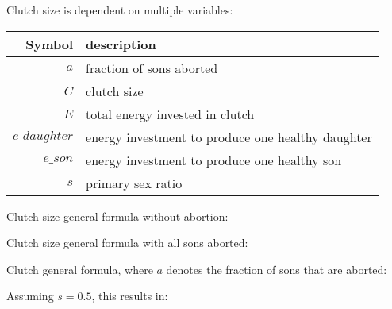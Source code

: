 \documentclass[11]{article}
\begin{document}
Clutch size is dependent on multiple variables:

\bigskip

\begin{tabular}{ | r | l | }
  \hline
  Symbol & description \\ 
  \hline
  $a$ & fraction of sons aborted \\
  $C$ & clutch size \\
  $E$ & total energy invested in clutch \\
  $e\_daughter$ & energy investment to produce one healthy daughter \\
  $e\_son$ & energy investment to produce one healthy son \\
  $s$ & primary sex ratio \\
  \hline
\end{tabular}

\bigskip

Clutch size general formula without abortion:



Clutch size general formula with all sons aborted:



Clutch general formula, where $a$ denotes the fraction of sons that are aborted:



Assuming $s=0.5$, this results in:


\end{document}

